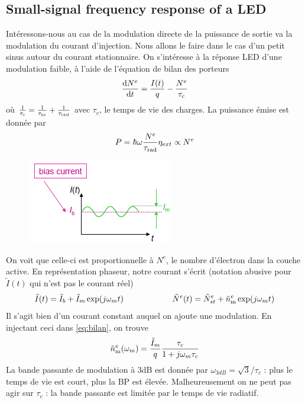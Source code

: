 \subsection{Small-signal frequency response of a LED}
Intéressons-nous au cas de la modulation directe de la puissance de sortie va la modulation du 
courant d'injection. Nous allons le faire dans le cas d'un petit sinus autour du courant stationnaire.
On s'intéresse à la réponse LED d'une modulation faible, à l'aide de l'équation de bilan des porteurs
\begin{equation}
\frac{{{\rm{d}}{N^e}}}{{{\rm{d}}t}} = \frac{{I(t)}}{q} - \frac{{{N^e}}}{{{\tau _{\rm{c}}}}}
\label{eq:bilan}
\end{equation}
où $\frac{1}{{{\tau _{\rm{c}}}}} = \frac{1}{{{\tau _{{\rm{nr}}}}}} + \frac{1}{{{\tau _{{\rm{rad}}}}}}$
avec $\tau_c$, le temps de vie des charges. La puissance émise est donnée par 
\begin{equation}
P = \hbar \omega \frac{{{N^e}}}{{{\tau _{{\rm{rad}}}}}}{\eta _{ext}} \propto {N^e}
\end{equation}

	\begin{figure}
	\vspace{-3mm}
	\includegraphics[scale=0.65]{ch4/image9}
	\end{figure}
On voit que celle-ci est proportionnelle à $N^e$, le nombre d'électron dans la couche active. En
représentation phaseur, notre courant s'écrit (notation abusive pour $\tilde I(t)$ qui n'est pas le
courant réel)
\begin{equation}
\tilde I(t) = {\tilde I_b} + {\tilde I_m}\exp (j{\omega _m}t)\qquad\qquad\qquad
{\tilde N^e}(t) = {\tilde N^e}_{st} + \tilde n_{\rm{m}}^e\exp (j{\omega _m}t)
\end{equation}
Il s'agit bien d'un courant constant auquel on ajoute une modulation. En injectant ceci dans \eqref{eq:bilan}, on trouve
\begin{equation}
\tilde n_{\rm{m}}^e({\omega _m}) = \frac{{{{\tilde I}_m}}}{q}\frac{{{\tau _c}}}{{1 + j{\omega _m}{\tau
 _c}}}
\end{equation}
La bande passante de modulation à 3dB est donnée par $\omega_{3dB} = \sqrt{3}/\tau_c$ : plus le temps
de vie est court, plus la BP est élevée. Malheureusement on ne peut pas agir sur $\tau_c$ : la bande
passante est limitée par le temps de vie radiatif.

